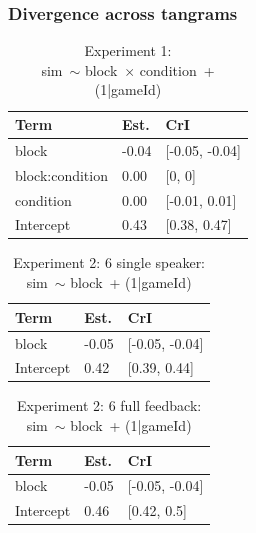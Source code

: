 \documentclass[
  english,
  a4paper,
]{article}
\begin{document}
\pagebreak

\hypertarget{divergence-across-tangrams}{%
\subsubsection{Divergence across tangrams}\label{divergence-across-tangrams}}

\begin{table}[h!]

\caption{\label{tab:unnamed-chunk-14}Experiment 1:\\ sim~$\sim$ block~$\times$ condition~+ (1|gameId)}
\centering
\begin{tabular}[t]{lll}
\toprule
Term & Est. & CrI\\
\midrule
block & -0.04 & {}[-0.05, -0.04]\\
block:condition & 0.00 & {}[0, 0]\\
condition & 0.00 & {}[-0.01, 0.01]\\
Intercept & 0.43 & {}[0.38, 0.47]\\
\bottomrule
\end{tabular}
\end{table}

\begin{table}[h!]

\caption{\label{tab:unnamed-chunk-14}Experiment 2: 6 single speaker:\\ sim~$\sim$ block~+ (1|gameId)}
\centering
\begin{tabular}[t]{lll}
\toprule
Term & Est. & CrI\\
\midrule
block & -0.05 & {}[-0.05, -0.04]\\
Intercept & 0.42 & {}[0.39, 0.44]\\
\bottomrule
\end{tabular}
\end{table}

\begin{table}[h!]

\caption{\label{tab:unnamed-chunk-14}Experiment 2: 6 full feedback:\\ sim~$\sim$ block~+ (1|gameId)}
\centering
\begin{tabular}[t]{lll}
\toprule
Term & Est. & CrI\\
\midrule
block & -0.05 & {}[-0.05, -0.04]\\
Intercept & 0.46 & {}[0.42, 0.5]\\
\bottomrule
\end{tabular}
\end{table}
\end{document}
